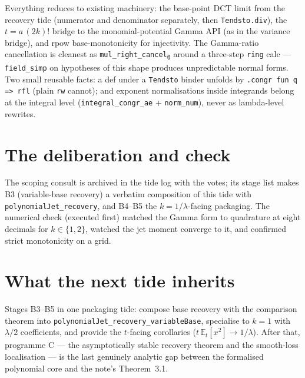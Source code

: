 \documentclass[11pt]{article}
\begin{document}
Everything reduces to existing machinery: the base-point DCT limit
from the recovery tide (numerator and denominator separately, then
\texttt{Tendsto.div}), the $t = a\,(2k)!$ bridge to the
monomial-potential Gamma API (as in the variance bridge), and rpow
base-monotonicity for injectivity. The Gamma-ratio cancellation is
cleanest as \texttt{mul\_right\_cancel\textsubscript{0}} around a three-step
\texttt{ring} calc --- \texttt{field\_simp} on hypotheses of this
shape produces unpredictable normal forms. Two small reusable facts:
a def under a \texttt{Tendsto} binder unfolds by
\texttt{.congr fun q => rfl} (plain \texttt{rw} cannot); and
exponent normalisations inside integrands belong at the integral
level (\texttt{integral\_congr\_ae} + \texttt{norm\_num}), never as
lambda-level rewrites.

\section{The deliberation and check}

The scoping consult is archived in the tide log with the votes; its
stage list makes B3 (variable-base recovery) a verbatim composition
of this tide with \texttt{polynomialJet\_recovery}, and B4--B5 the
$k = 1$/$\lambda$-facing packaging. The numerical check (executed
first) matched the Gamma form to quadrature at eight decimals for
$k \in \{1, 2\}$, watched the jet moment converge to it, and
confirmed strict monotonicity on a grid.

\section{What the next tide inherits}

Stages B3--B5 in one packaging tide: compose base recovery with the
comparison theorem into
\texttt{polynomialJet\_recovery\_variableBase}, specialise to
$k = 1$ with $\lambda/2$ coefficients, and provide the
$t$-facing corollaries ($t\,\mathbb{E}_t[x^2] \to 1/\lambda$). After
that, programme C --- the asymptotically stable recovery theorem and
the smooth-loss localisation --- is the last genuinely analytic gap
between the formalised polynomial core and the note's Theorem~3.1.
\end{document}
